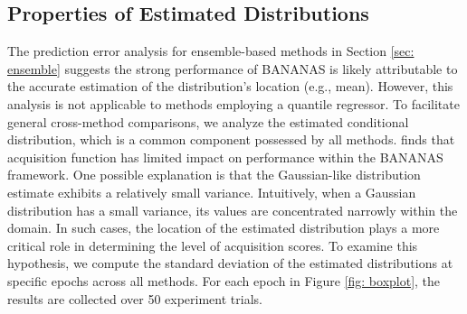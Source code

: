 \documentclass[a4paper,oneside,bibliography=totoc]{scrbook}
\begin{document}
\subsection{Properties of Estimated Distributions}
The prediction error analysis for ensemble-based methods in Section \ref{sec: ensemble} suggests the strong performance of BANANAS is likely attributable to the accurate estimation of the distribution's location (e.g., mean). However, this analysis is not applicable to methods employing a quantile regressor. To facilitate general cross-method comparisons, we analyze the estimated conditional distribution, which is a common component possessed by all methods.  \cite{white2019bananas} finds that  acquisition function has limited impact on performance within the BANANAS framework. One possible explanation is that the Gaussian-like distribution estimate exhibits a relatively small variance. Intuitively, when a Gaussian distribution has a small variance, its values are concentrated narrowly within the domain. In such cases, the location of the estimated distribution plays a more critical role in determining the level of acquisition scores. To examine this hypothesis, we compute the standard deviation of the estimated  distributions at specific epochs across all methods. For each epoch in Figure \ref{fig: boxplot}, the results are collected over 50 experiment trials.
\end{document}
